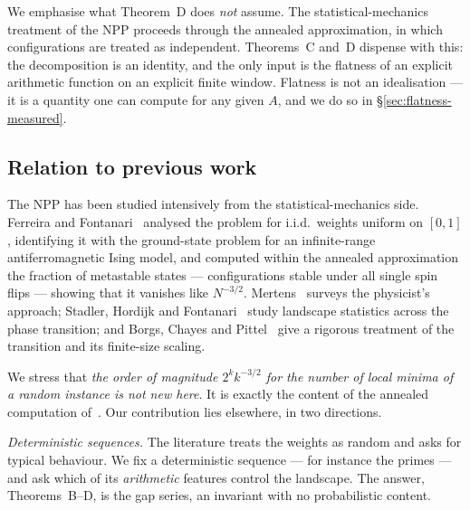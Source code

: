 \documentclass[11pt,a4paper]{article}
\theoremstyle{plain}
\theoremstyle{definition}
\theoremstyle{remark}
\begin{document}
We emphasise what Theorem~D does \emph{not} assume. The statistical-mechanics
treatment of the NPP proceeds through the annealed approximation, in which
configurations are treated as independent. Theorems~C and~D dispense with this:
the decomposition is an identity, and the only input is the flatness of an
explicit arithmetic function on an explicit finite window. Flatness is not an
idealisation --- it is a quantity one can compute for any given $A$, and we do
so in \S\ref{sec:flatness-measured}.

\subsection{Relation to previous work}

The NPP has been studied intensively from the statistical-mechanics side.
Ferreira and Fontanari~\cite{FF98} analysed the problem for i.i.d.\ weights
uniform on $[0,1]$, identifying it with the ground-state problem for an
infinite-range antiferromagnetic Ising model, and computed within the annealed
approximation the fraction of metastable states --- configurations stable under
all single spin flips --- showing that it vanishes like $N^{-3/2}$.
Mertens~\cite{Me01} surveys the physicist's approach; Stadler, Hordijk and
Fontanari~\cite{SHF03} study landscape statistics across the phase transition;
and Borgs, Chayes and Pittel~\cite{BCP01} give a rigorous treatment of the
transition and its finite-size scaling.

We stress that \emph{the order of magnitude $2^{k}k^{-3/2}$ for the number of
local minima of a random instance is not new here}. It is exactly the content of
the annealed computation of~\cite{FF98}. Our contribution lies elsewhere, in two
directions.

\emph{Deterministic sequences.} The literature treats the weights as random and
asks for typical behaviour. We fix a deterministic sequence --- for instance the
primes --- and ask which of its \emph{arithmetic} features control the
landscape. The answer, Theorems~B--D, is the gap series, an invariant with no
probabilistic content.
\end{document}

